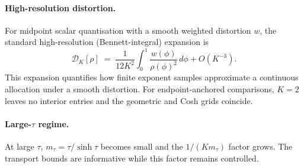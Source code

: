 \paragraph{High-resolution distortion.} For midpoint scalar quantisation with
a smooth weighted distortion $w$, the standard high-resolution (Bennett-integral)
expansion \citep{gray1998quantization} is
\begin{equation}
\mathcal{D}_K[\rho] \;=\; \frac{1}{12K^2}\int_0^1 \frac{w(\phi)}{\rho(\phi)^2}\,d\phi + O(K^{-3}).
\label{eq:high-res-distortion}
\end{equation}
This expansion quantifies how finite exponent samples approximate a continuous
allocation under a smooth distortion. For endpoint-anchored comparisons,
$K=2$ leaves no interior entries and the geometric and Cosh grids coincide.

\paragraph{Large-$\tau$ regime.} At large $\tau$,
$m_\tau{=}\tau/\sinh\tau$ becomes small and the $1/(Km_\tau)$ factor grows.
The transport bounds are informative while this factor remains controlled.
